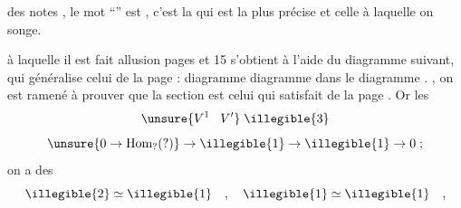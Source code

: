

\uline{}

 des notes ,  
 le mot ``'' est , c'est la  qui est la
plus précise et celle à laquelle on songe.

 à laquelle il est fait allusion pages 
et 15 s'obtient à l'aide du diagramme suivant, qui généralise celui de la
page  :
 diagramme   diagramme 
  
 dans le diagramme . 
, on est ramené à prouver que la section
      
  est celui qui 
 satisfait   de la
page . Or les  
\[ \unsure{V^1 \;\;\; V'} \;\illegible{3} \]
\placedmargin{\unsure{||}} 
\[ \unsure{0 \to \mathrm{Hom}_{?}(?)} \to \illegible{1} \to \illegible{1} \to 0 \; ; \]
 on a des 
\[ \illegible{2} \simeq \illegible{1} \quad , \quad \illegible{1} \simeq \illegible{1} \quad , \]
  \unsure{)} 

